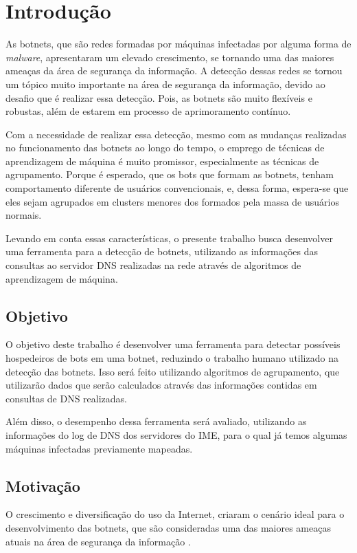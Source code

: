 \chapter{Introdução}
As botnets, que são redes formadas por máquinas infectadas por alguma forma de \textit{malware}, apresentaram um elevado crescimento, se tornando uma das maiores ameaças da área de segurança da informação. A detecção dessas redes se tornou um tópico muito importante na área de segurança da informação, devido ao desafio que é realizar essa detecção. Pois, as botnets são muito flexíveis e robustas, além de estarem em processo de aprimoramento contínuo.

Com a necessidade de realizar essa detecção, mesmo com as mudanças realizadas no funcionamento das botnets ao longo do tempo, o emprego de técnicas de aprendizagem de máquina é muito promissor, especialmente as técnicas de agrupamento. Porque é esperado, que os bots que formam as botnets, tenham comportamento diferente de usuários convencionais, e, dessa forma, espera-se que eles sejam agrupados em clusters menores dos formados pela massa de usuários normais.

Levando em conta essas características, o presente trabalho busca desenvolver uma ferramenta para a detecção de botnets, utilizando as informações das consultas ao servidor DNS realizadas na rede através de algoritmos de aprendizagem de máquina.

\section{Objetivo}
O objetivo deste trabalho é desenvolver uma ferramenta para detectar possíveis hospedeiros de bots em uma botnet, reduzindo o trabalho humano utilizado na detecção das botnets. Isso será feito utilizando algoritmos de agrupamento, que utilizarão dados que serão calculados através das informações contidas em consultas de DNS realizadas. 

Além disso, o desempenho dessa ferramenta será avaliado, utilizando as informações do log de DNS dos servidores do IME, para o qual já temos algumas máquinas infectadas previamente mapeadas.

\section{Motivação}
O crescimento e diversificação do uso da Internet, criaram o cenário ideal para o desenvolvimento das botnets, que são consideradas uma das maiores ameaças atuais na área de segurança da informação \citep{ji2008botnet}.

